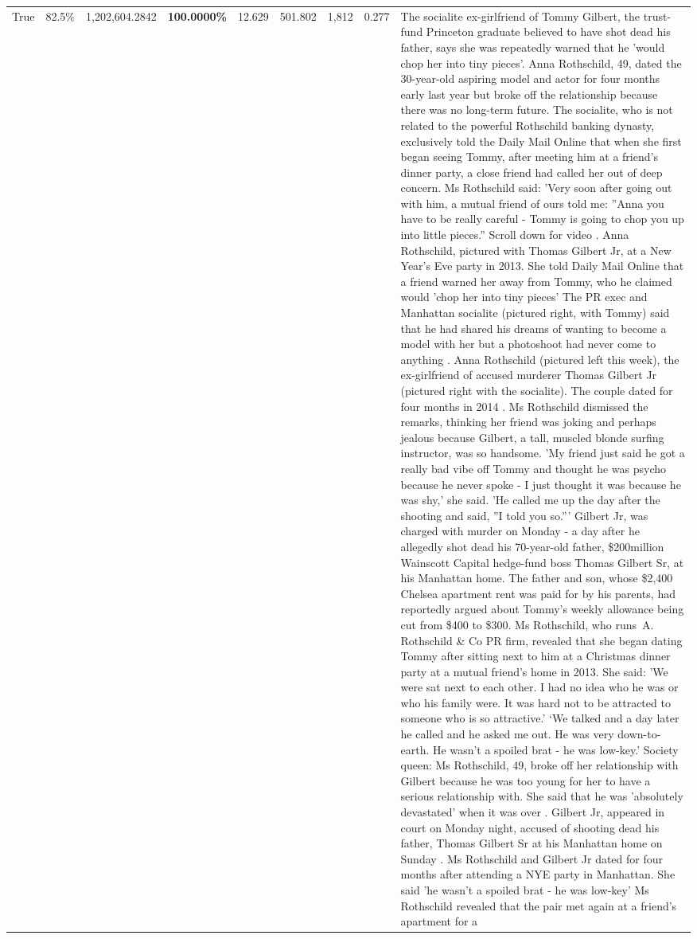 \begin{table}[H]
\begin{tabular}{lllrlllll}
True & 82.5\% & 1,202,604.2842 & \bfseries \color{red} 100.0000\% & 12.629 & 501.802 & 1,812 & 0.277 & The socialite ex-girlfriend of Tommy Gilbert, the trust-fund Princeton graduate believed to have shot dead his father, says she was repeatedly warned that he 'would chop her into tiny pieces'. Anna Rothschild, 49, dated the 30-year-old aspiring model and actor for four months early last year but broke off the relationship because there was no long-term future. The socialite, who is not related to the powerful Rothschild banking dynasty, exclusively told the Daily Mail Online that when she first began seeing Tommy, after meeting him at a friend's dinner party, a close friend had called her out of deep concern. Ms Rothschild said: 'Very soon after going out with him, a mutual friend of ours told me: ''Anna you have to be really careful - Tommy is going to chop you up into little pieces.'' Scroll down for video . Anna Rothschild, pictured with Thomas Gilbert Jr, at a New Year's Eve party in 2013. She told Daily Mail Online that a friend warned her away from Tommy, who he claimed would 'chop her into tiny pieces' The PR exec and Manhattan socialite (pictured right, with Tommy) said that he had shared his dreams of wanting to become a model with her but a photoshoot had never come to anything . Anna Rothschild (pictured left this week), the ex-girlfriend of accused murderer Thomas Gilbert Jr (pictured right with the socialite). The couple dated for four months in 2014 . Ms Rothschild dismissed the remarks, thinking her friend was joking and perhaps jealous because Gilbert, a tall, muscled blonde surfing instructor, was so handsome. 'My friend just said he got a really bad vibe off Tommy and thought he was psycho because he never spoke - I just thought it was because he was shy,' she said. 'He called me up the day after the shooting and said, ''I told you so.''' Gilbert Jr, was charged with murder on Monday - a day after he allegedly shot dead his 70-year-old father, \$200million Wainscott Capital hedge-fund boss Thomas Gilbert Sr, at his Manhattan home. The father and son, whose \$2,400 Chelsea apartment rent was paid for by his parents, had reportedly argued about Tommy's weekly allowance being cut from \$400 to \$300. Ms Rothschild, who runs A. Rothschild \& Co PR firm, revealed that she began dating Tommy after sitting next to him at a Christmas dinner party at a mutual friend's home in 2013. She said: 'We were sat next to each other. I had no idea who he was or who his family were. It was hard not to be attracted to someone who is so attractive.' ‘We talked and a day later he called and he asked me out. He was very down-to-earth. He wasn’t a spoiled brat - he was low-key.’ Society queen: Ms Rothschild, 49, broke off her relationship with Gilbert because he was too young for her to have a serious relationship with. She said that he was 'absolutely devastated' when it was over . Gilbert Jr, appeared in court on Monday night, accused of shooting dead his father, Thomas Gilbert Sr at his Manhattan home on Sunday . Ms Rothschild and Gilbert Jr dated for four months after attending a NYE party in Manhattan. She said 'he wasn't a spoiled brat - he was low-key' Ms Rothschild revealed that the pair met again at a friend’s apartment for a 
\end{tabular}
\end{table}
